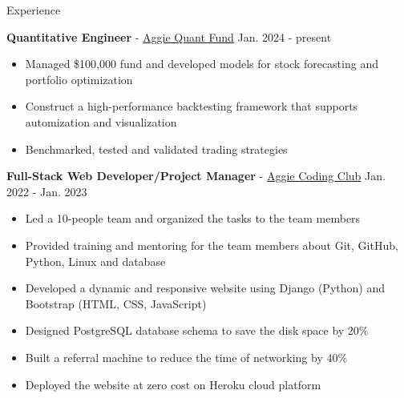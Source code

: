 \documentclass{resume}
\begin{document}
\begin{rSection}{Experience}
    \item \textbf{Quantitative Engineer} - \href{https://www.linkedin.com/company/aggieqf}{Aggie Quant Fund} \hfill Jan. 2024 - present
        \begin{itemize}
        \item Managed \$100,000 fund and developed models for stock forecasting and portfolio optimization
        \item Construct a high-performance backtesting framework that supports automization and visualization
        \item Benchmarked, tested and validated trading strategies
        \end{itemize}

    \item \textbf{Full-Stack Web Developer/Project Manager} - \href{https://aggiecodingclub.com}{Aggie Coding Club} \hfill Jan. 2022 - Jan. 2023
    \begin{itemize}
        \item Led a 10-people team and organized the tasks to the team members
        \item Provided training and mentoring for the team members about Git, GitHub, Python, Linux and database
        \item Developed a dynamic and responsive website using Django (Python) and Bootstrap (HTML, CSS, JavaScript)
        \item Designed PostgreSQL database schema to save the disk space by 20\%
        \item Built a referral machine to reduce the time of networking by 40\%
        \item Deployed the website at zero cost on Heroku cloud platform
    \end{itemize}



\end{rSection}
\end{document}
